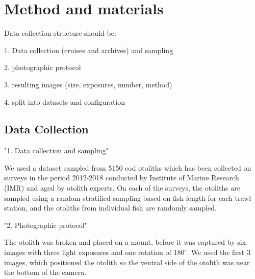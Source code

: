 \documentclass[10pt,letterpaper]{article}
\begin{document}
\section*{Method and materials}

Data collection structure should be:

1. Data collection (cruises and archives) and sampling 

2. photographic protocol

3. resulting images (size, exposures, number, method)

4. split into datasets and configuration

\subsection*{Data Collection}

"1. Data collection and sampling"

We used a dataset sampled from 5150 cod otoliths which has been collected 
on surveys in the period 2012-2018 conducted by Institute of Marine Research (IMR) and aged by otolith experts. On each of the surveys, the otoliths are sampled using a random-stratified sampling based on fish length for each trawl station, and the otoliths from individual fish are randomly sampled.

"2. Photographic protocol" 

The otolith was broken and placed on a mount, before it was captured by six images with three light exposures and one rotation of 180$^{\circ}$. We used the first 3 images, 
which positioned the otolith so the ventral side of the otolith was near the bottom of the camera.
 
\end{document}
